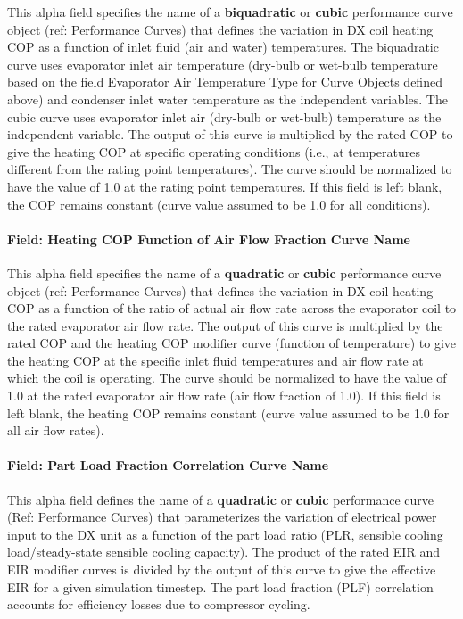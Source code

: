 This alpha field specifies the name of a \textbf{biquadratic} or \textbf{cubic} performance curve object (ref: Performance Curves) that defines the variation in DX coil heating COP as a function of inlet fluid (air and water) temperatures. The biquadratic curve uses evaporator inlet air temperature (dry-bulb or wet-bulb temperature based on the field Evaporator Air Temperature Type for Curve Objects defined above) and condenser inlet water temperature as the independent variables. The cubic curve uses evaporator inlet air (dry-bulb or wet-bulb) temperature as the independent variable. The output of this curve is multiplied by the rated COP to give the heating COP at specific operating conditions (i.e., at temperatures different from the rating point temperatures). The curve should be normalized to have the value of 1.0 at the rating point temperatures. If this field is left blank, the COP remains constant (curve value assumed to be 1.0 for all conditions).

\paragraph{Field: Heating COP Function of Air Flow Fraction Curve Name}\label{field-heating-cop-function-of-air-flow-fraction-curve-name-1}

This alpha field specifies the name of a \textbf{quadratic} or \textbf{cubic} performance curve object (ref: Performance Curves) that defines the variation in DX coil heating COP as a function of the ratio of actual air flow rate across the evaporator coil to the rated evaporator air flow rate. The output of this curve is multiplied by the rated COP and the heating COP modifier curve (function of temperature) to give the heating COP at the specific inlet fluid temperatures and air flow rate at which the coil is operating. The curve should be normalized to have the value of 1.0 at the rated evaporator air flow rate (air flow fraction of 1.0). If this field is left blank, the heating COP remains constant (curve value assumed to be 1.0 for all air flow rates).

\paragraph{Field: Part Load Fraction Correlation Curve Name}\label{field-part-load-fraction-correlation-curve-name-9}

This alpha field defines the name of a \textbf{quadratic} or \textbf{cubic} performance curve (Ref: Performance Curves) that parameterizes the variation of electrical power input to the DX unit as a function of the part load ratio (PLR, sensible cooling load/steady-state sensible cooling capacity). The product of the rated EIR and EIR modifier curves is divided by the output of this curve to give the effective EIR for a given simulation timestep. The part load fraction (PLF) correlation accounts for efficiency losses due to compressor cycling.

